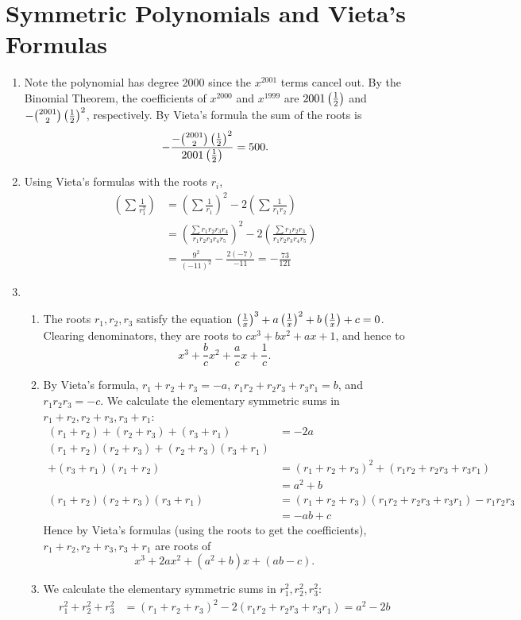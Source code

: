 \section{Symmetric Polynomials and Vieta's Formulas}
\begin{enumerate}
\item Note the polynomial has degree 2000 since the $x^{2001}$ terms cancel out. By the Binomial Theorem, the coefficients of $x^{2000}$ and $x^{1999}$ are $2001\left( {\frac{1}{2}} \right)$ and $-\binom{2001}{2}\left( {\frac{1}{2}} \right)^2$, respectively. By Vieta's formula the sum of the roots is
\[
-\frac{-\binom{2001}{2}\left( {\frac{1}{2}} \right)^2}{2001\left( {\frac{1}{2}} \right)}=500.
\]
\item Using Vieta's formulas with the roots $r_i$,
\begin{align*}
\left(\sum\frac{1}{r_1^2}\right)&=\left(\sum\frac{1}{r_1}\right)^2-2\left(\sum\frac{1}{r_1r_2}\right)\\
&=\left(\frac{\sum r_1r_2r_3r_4}{r_1r_2r_3r_4r_5}\right)^2
-2\left(\frac{\sum r_1r_2r_3}{r_1r_2r_3r_4r_5}\right)\\
&=\frac{9^2}{(-11)^2}-\frac{2(-7)}{-11}=-\frac{73}{121}
\end{align*}
\item
\begin{enumerate}
\item The roots $r_1,r_2,r_3$ satisfy the equation $\left( {\frac{1}{x}} \right)^3+a\left( {\frac{1}{x}} \right)^2+b\left( {\frac{1}{x}} \right)+c=0$. Clearing denominators, they are roots to $cx^3+bx^2+ax+1$, and hence to \[x^3+\frac{b}{c}x^2+\frac{a}{c}x+\frac{1}{c}.\]
\item By Vieta's formula, $r_1+r_2+r_3=-a$, $r_1r_2+r_2r_3+r_3r_1=b$, and $r_1r_2r_3=-c$. We calculate the elementary symmetric sums in $r_1+r_2,r_2+r_3,r_3+r_1$:
\begin{align*}
(r_1+r_2)+(r_2+r_3)+(r_3+r_1)&=-2a\\
(r_1+r_2)(r_2+r_3)+(r_2+r_3)(r_3+r_1)\\+(r_3+r_1)(r_1+r_2)
&=(r_1+r_2+r_3)^2+(r_1r_2+r_2r_3+r_3r_1)\\
&=a^2+b\\
(r_1+r_2)(r_2+r_3)(r_3+r_1)&=(r_1+r_2+r_3)(r_1r_2+r_2r_3+r_3r_1)-r_1r_2r_3\\
&=-ab+c
\end{align*}
Hence by Vieta's formulas (using the roots to get the coefficients), $r_1+r_2,r_2+r_3,r_3+r_1$ are roots of
\[
x^3+2ax^2+(a^2+b)x+(ab-c).
\]
\item We calculate the elementary symmetric sums in $r_1^2,r_2^2,r_3^2$:
\begin{align*}
r_1^2+r_2^2+r_3^2&=(r_1+r_2+r_3)^2-2(r_1r_2+r_2r_3+r_3r_1)=a^2-2b\\

\end{align*}
\end{enumerate}
\end{enumerate}

